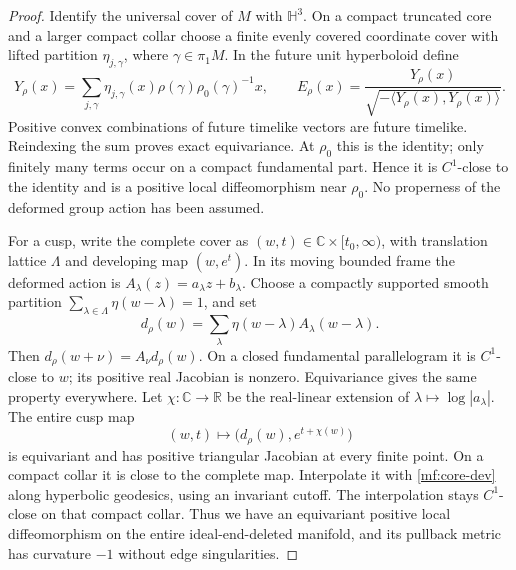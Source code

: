 \documentclass[11pt]{article}
\numberwithin{equation}{section}
\theoremstyle{definition}
\theoremstyle{remark}
\begin{document}
\begin{proof}
Identify the universal cover of \(M\) with \(\mathbb H^3\).
On a compact truncated core and a larger compact collar choose a
finite evenly covered coordinate cover with lifted partition
\(\eta_{j,\gamma}\), where \(\gamma\in\pi_1M\).
In the future unit hyperboloid define
\begin{equation}\label{mf:core-dev}
 Y_\rho(x)=\sum_{j,\gamma}\eta_{j,\gamma}(x)
       \rho(\gamma)\rho_0(\gamma)^{-1}x,\qquad
 E_\rho(x)=\frac{Y_\rho(x)}
                 {\sqrt{-\langle Y_\rho(x),Y_\rho(x)\rangle}}.
\end{equation}
Positive convex combinations of future timelike vectors are future
timelike. Reindexing the sum proves exact equivariance.
At \(\rho_0\) this is the identity; only finitely many terms occur
on a compact fundamental part. Hence it is \(C^1\)-close to the
identity and is a positive local diffeomorphism near \(\rho_0\).
No properness of the deformed group action has been assumed.

For a cusp, write the complete cover as
\((w,t)\in\mathbb C\times[t_0,\infty)\), with translation lattice
\(\Lambda\) and developing map \((w,e^t)\).
In its moving bounded frame the deformed action is
\(A_\lambda(z)=a_\lambda z+b_\lambda\).
Choose a compactly supported smooth partition
\(\sum_{\lambda\in\Lambda}\eta(w-\lambda)=1\), and set
\begin{equation}\label{mf:link-dev}
 d_\rho(w)=\sum_\lambda\eta(w-\lambda)A_\lambda(w-\lambda).
\end{equation}
Then \(d_\rho(w+\nu)=A_\nu d_\rho(w)\).
On a closed fundamental parallelogram it is \(C^1\)-close to \(w\);
its positive real Jacobian is nonzero. Equivariance gives the same
property everywhere. Let \(\chi:\mathbb C\to\mathbb R\) be the
real-linear extension of
\(\lambda\mapsto\log|a_\lambda|\). The entire cusp map
\begin{equation}\label{mf:tail-dev}
             (w,t)\longmapsto
           \bigl(d_\rho(w),e^{t+\chi(w)}\bigr)
\end{equation}
is equivariant and has positive triangular Jacobian at every finite
point. On a compact collar it is close to the complete map.
Interpolate it with \eqref{mf:core-dev} along hyperbolic geodesics,
using an invariant cutoff. The interpolation stays \(C^1\)-close
on that compact collar. Thus we have an equivariant positive local
diffeomorphism on the entire ideal-end-deleted manifold, and its
pullback metric has curvature \(-1\) without edge singularities.


\end{proof}
\end{document}

